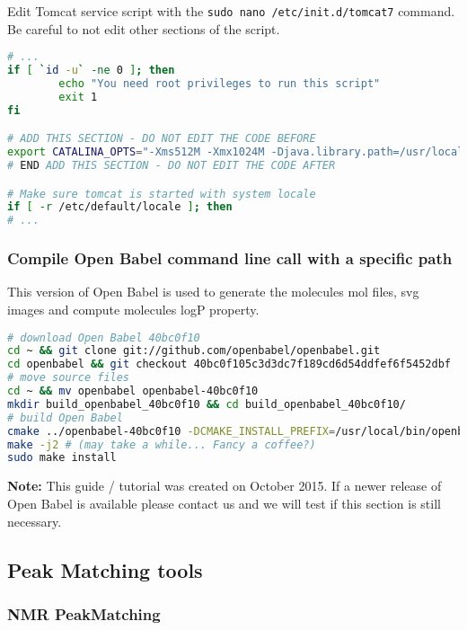 Edit Tomcat service script with the \texttt{sudo nano /etc/init.d/tomcat7} command. 
Be careful to not edit other sections of the script. 
\begin{lstlisting}[language=bash,caption={Tomcat service script},frame=bt]
# ...
if [ `id -u` -ne 0 ]; then
        echo "You need root privileges to run this script"
        exit 1
fi

# ADD THIS SECTION - DO NOT EDIT THE CODE BEFORE
export CATALINA_OPTS="-Xms512M -Xmx1024M -Djava.library.path=/usr/local/lib"
# END ADD THIS SECTION - DO NOT EDIT THE CODE AFTER

# Make sure tomcat is started with system locale
if [ -r /etc/default/locale ]; then
# ...
\end{lstlisting}

\subsubsection{Compile Open Babel command line call with a specific path}

This version of Open Babel is used to generate the molecules mol files, svg images and compute molecules logP property.
\begin{lstlisting}[language=bash,caption={Install a specific version of Open Babel in a specific directory},frame=bt]
# download Open Babel 40bc0f10
cd ~ && git clone git://github.com/openbabel/openbabel.git
cd openbabel && git checkout 40bc0f105c3d3dc7f189cd6d54ddfef6f5452dbf
# move source files
cd ~ && mv openbabel openbabel-40bc0f10 
mkdir build_openbabel_40bc0f10 && cd build_openbabel_40bc0f10/
# build Open Babel 
cmake ../openbabel-40bc0f10 -DCMAKE_INSTALL_PREFIX=/usr/local/bin/openbabel-40bc0f10
make -j2 # (may take a while... Fancy a coffee?)
sudo make install
\end{lstlisting}

\textbf{Note:} This guide / tutorial was created on October 2015. 
If a newer release of Open Babel is available please contact us and we will test if this section is still necessary.

\subsection{Peak Matching tools}

\subsubsection{NMR PeakMatching}

